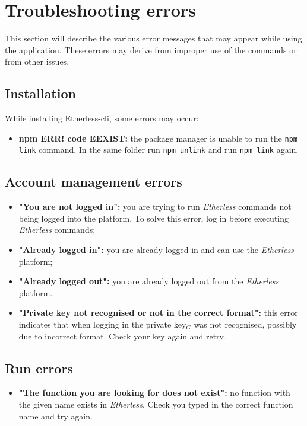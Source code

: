 \section{Troubleshooting errors}
  This section will describe the various error messages that may appear while using the application. These errors may derive from improper use of the commands or from other issues.
  \subsection{Installation}
    While installing Etherless-cli, some errors may occur:
    \begin{itemize}
      \item \textbf{npm ERR! code EEXIST:} the package manager is unable to run the \texttt{npm link} command. In the same folder run \texttt{npm unlink} and run \texttt{npm link} again.
    \end{itemize}
  \subsection{Account management errors}
    \begin{itemize}
      \item \textbf{"You are not logged in":} you are trying to run \textit{Etherless} commands not being logged into the platform. To solve this error, log in before executing \textit{Etherless} commands;
      \item \textbf{"Already logged in":} you are already logged in and can use the \textit{Etherless} platform;
      \item \textbf{"Already logged out":} you are already logged out from the \textit{Etherless} platform.
      \item \textbf{"Private key not recognised or not in the correct format":} this error indicates that when logging in the private key$_{G}$ was not recognised, possibly due to incorrect format. Check your key again and retry.
    \end{itemize}
  \subsection{Run errors}
  \begin{itemize}
    \item \textbf{"The function you are looking for does not exist":} no function with the given name exists in \textit{Etherless}. Check you typed in the correct function name and try again.
  \end{itemize}
